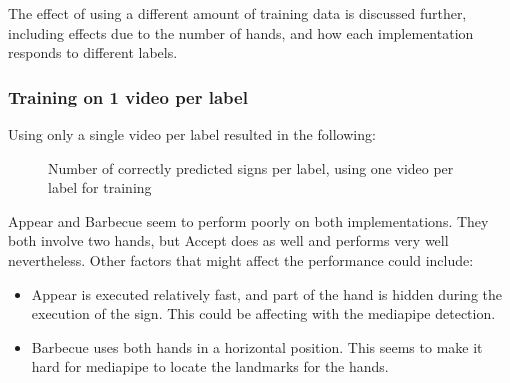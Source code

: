 \documentclass[final,rdr32.tex]{subfiles}
\begin{document}
The effect of using a different amount of training data is discussed further, including effects due to the number of hands, and how each implementation responds to different labels.


\subsubsection{Training on 1 video per label}

Using only a single video per label resulted in the following:

\begin{figure}[H]
    \begin{center}
    \end{center}
    \caption{Number of correctly predicted signs per label, using one video per label for training}
    \label{bar:one}
\end{figure}

Appear and Barbecue seem to perform poorly on both implementations. They both involve two hands, but Accept does as well and performs very well nevertheless. Other factors that might affect the performance could include:

\begin{itemize}
    \item Appear is executed relatively fast, and part of the hand is hidden during the execution of the sign. This could be affecting with the mediapipe detection.
    \item Barbecue uses both hands in a horizontal position. This seems to make it hard for mediapipe to locate the landmarks for the hands.
\end{itemize}
\end{document}
